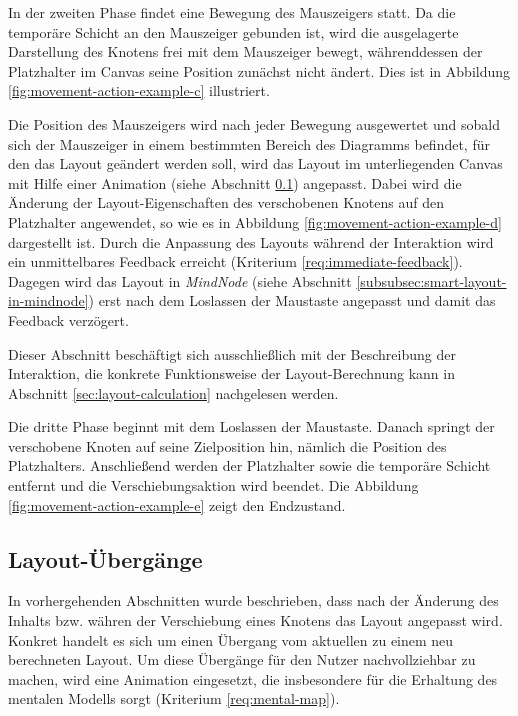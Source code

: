 In der zweiten Phase findet eine Bewegung des Mauszeigers statt. Da die temporäre Schicht an den Mauszeiger gebunden ist, wird die ausgelagerte Darstellung des Knotens frei mit dem Mauszeiger bewegt, währenddessen der Platzhalter im Canvas seine Position zunächst nicht ändert. Dies ist in Abbildung \ref{fig:movement-action-example-c} illustriert.

Die Position des Mauszeigers wird nach jeder Bewegung ausgewertet und sobald sich der Mauszeiger in einem bestimmten Bereich des Diagramms befindet, für den das Layout geändert werden soll, wird das Layout im unterliegenden Canvas mit Hilfe einer Animation (siehe Abschnitt \ref{subsec:layout-transition}) angepasst. Dabei wird die Änderung der Layout-Eigenschaften des verschobenen Knotens auf den Platzhalter angewendet, so wie es in Abbildung \ref{fig:movement-action-example-d} dargestellt ist. Durch die Anpassung des Layouts während der Interaktion wird ein unmittelbares Feedback erreicht (Kriterium \ref{req:immediate-feedback}). Dagegen wird das Layout in \textit{MindNode} (siehe Abschnitt \ref{subsubsec:smart-layout-in-mindnode}) erst nach dem Loslassen der Maustaste angepasst und damit das Feedback verzögert.

Dieser Abschnitt beschäftigt sich ausschließlich mit der Beschreibung der Interaktion, die konkrete Funktionsweise der Layout-Berechnung kann in Abschnitt \ref{sec:layout-calculation} nachgelesen werden.

Die dritte Phase beginnt mit dem Loslassen der Maustaste. Danach springt der verschobene Knoten auf seine Zielposition hin, nämlich die Position des Platzhalters. Anschließend werden der Platzhalter sowie die temporäre Schicht entfernt und die Verschiebungsaktion wird beendet. Die Abbildung \ref{fig:movement-action-example-e} zeigt den Endzustand.

\subsection{Layout-Übergänge}
\label{subsec:layout-transition}

In vorhergehenden Abschnitten wurde beschrieben, dass nach der Änderung des Inhalts bzw. währen der Verschiebung eines Knotens das Layout angepasst wird. Konkret handelt es sich um einen Übergang vom aktuellen zu einem neu berechneten Layout. Um diese Übergänge für den Nutzer nachvollziehbar zu machen, wird eine Animation eingesetzt, die insbesondere für die Erhaltung des mentalen Modells sorgt (Kriterium \ref{req:mental-map}).

